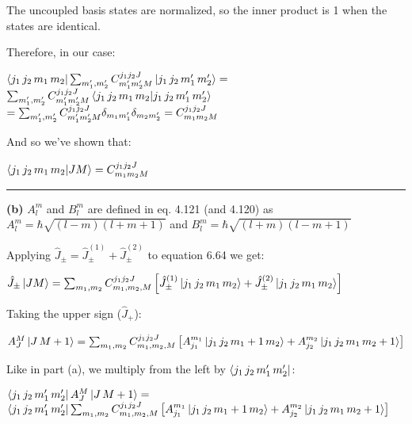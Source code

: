 \documentclass[14pt]{extarticle}
\makeatletter
\newenvironment{lefteqs}{%
    \begin{flushleft}%
    \renewcommand{\arraystretch}{1.3}%
    $\begin{array}{@{}l@{}}%
}{%
    \end{array}$%
    \end{flushleft}%
}
\makeatother
\begin{document}
The uncoupled basis states are normalized, so the inner product is 1 when the states are identical.

Therefore, in our case:
\begin{lefteqs}
    \bra{j_1 \, j_2 \, m_1 \, m_2} \sum_{m_1', m_2'} C^{j_1 j_2 J}_{m_1' m_2' M} \ket{j_1 \, j_2 \, m_1' \, m_2'} = \\
    \sum_{m_1', m_2'} C^{j_1 j_2 J}_{m_1' m_2' M} \braket{j_1 \, j_2 \, m_1 \, m_2 | j_1 \, j_2 \, m_1' \, m_2'} \\
    = \sum_{m_1', m_2'} C^{j_1 j_2 J}_{m_1' m_2' M} \delta_{m_1 m_1'} \delta_{m_2 m_2'} = C^{j_1 j_2 J}_{m_1 m_2 M}
\end{lefteqs}

And so we've shown that:

\begin{lefteqs}
    \braket{j_1 \, j_2 \, m_1 \, m_2 | J M} = C^{j_1 j_2 J}_{m_1 m_2 M}
\end{lefteqs}

\hrule
\vspace{2em}

\textbf{(b)}
$A^m_l$ and $B^m_l$ are defined in eq. 4.121 (and 4.120) as $A^m_l = \hbar \sqrt{(l - m)(l + m + 1)}$
and $B^m_l = \hbar \sqrt{(l + m)(l - m + 1)}$

Applying $\hat{J}_{\pm} = \hat{J}^{(1)}_{\pm} + \hat{J}^{(2)}_{\pm}$ to equation 6.64 we get:

\begin{lefteqs}
    \hat{J}_{\pm} \ket{J M} = \sum_{m_1, m_2} C^{j_1 j_2 J}_{m_1, m_2, M} \left[\hat{J}^{(1)}_{\pm} \ket{j_1 \, j_2 \, m_1 \, m_2} + \hat{J}^{(2)}_{\pm} \ket{j_1 \, j_2 \, m_1 \, m_2} \right]
\end{lefteqs}

Taking the upper sign ($\hat{J}_+$):

\begin{lefteqs}
    A^M_J \ket{J \, M+1} = \sum_{m_1, m_2} C^{j_1 j_2 J}_{m_1, m_2, M}
    \left[A^{m_1}_{j_1} \ket{j_1 \, j_2 \, m_1+1 \, m_2} + A^{m_2}_{j_2} \ket{j_1 \, j_2 \, m_1 \, m_2+1}  \right]
\end{lefteqs}

Like in part (a), we multiply from the left by $\bra{j_1 \, j_2 \, m_1' \, m_2'}$:

\begin{lefteqs}
    \bra{j_1 \, j_2 \, m_1' \, m_2'} A^M_J \ket{J \, M+1} = \\
    \bra{j_1 \, j_2 \, m_1' \, m_2'} \sum_{m_1, m_2} C^{j_1 j_2 J}_{m_1, m_2, M}
    \left[A^{m_1}_{j_1} \ket{j_1 \, j_2 \, m_1+1 \, m_2} + A^{m_2}_{j_2} \ket{j_1 \, j_2 \, m_1 \, m_2+1}  \right]
\end{lefteqs}
\end{document}
